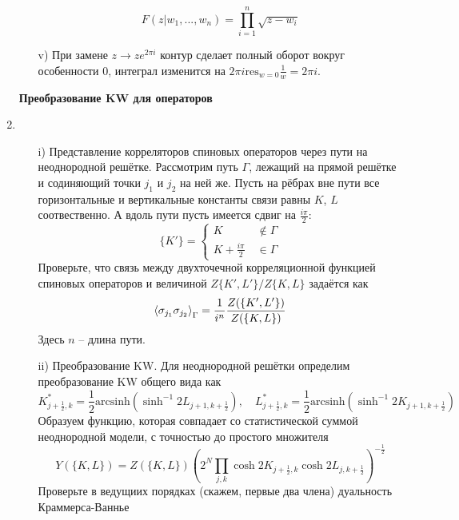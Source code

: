 \documentclass[12pt]{article}
\theoremstyle{definition}
\begin{document}
\begin{enumerate}
\begin{itemize}
\begin{equation}
            \boxed{F(z|w_1,...,w_n)=\prod\limits_{i=1}^n\sqrt{z-w_i}}
        \end{equation}
        \item[v)] При замене $z\rightarrow ze^{2\pi i}$ контур сделает полный оборот вокруг особенности $0$, интеграл изменится на $2\pi i\text{res}_{w=0}\frac{1}{w}=2\pi i$.
    \end{itemize}
\textbf{Преобразование KW для операторов}
\item
\begin{itemize}    
    \item[i)] Представление корреляторов спиновых операторов через пути на неоднородной решётке. Рассмотрим путь $\Gamma$, лежащий на прямой решётке и содиняющий точки $j_1$ и $j_2$ на ней же. Пусть на рёбрах вне пути все горизонтальные и вертикальные константы связи равны $K$, $L$ соотвественно. А вдоль пути пусть имеется сдвиг на $\frac{i\pi}{2}$:
    \begin{equation}
        \{K'\}=\begin{cases}
            K \quad\quad\quad\notin\Gamma\\
            K+\frac{i\pi}{2}\quad\in\Gamma
        \end{cases}
    \end{equation}
    Проверьте, что связь между двухточечной корреляционной функцией спиновых операторов и величиной $Z\{K',L'\}/Z\{K,L\}$ задаётся как
    \begin{equation}
        \braket{\sigma_{j_1}\sigma_{j_2}}_\Gamma=\frac{1}{i^n}\frac{Z(\{K',L'\})}{Z(\{K,L\})}
    \end{equation}
    Здесь $n$ -- длина пути.
    \item[ii)] Преобразование KW. Для неоднородной решётки определим преобразование KW общего вида как
    \begin{equation}
        K^*_{j+\frac{1}{2},k}=\frac{1}{2}\text{arcsinh}(\sinh^{-1}2L_{j+1,k+\frac{1}{2}}),\quad L^*_{j+\frac{1}{2},k}=\frac{1}{2}\text{arcsinh}(\sinh^{-1}2K_{j+1,k+\frac{1}{2}})
    \end{equation}
    Образуем функцию, которая совпадает со статистической суммой неоднородной модели, с точностью до простого множителя
    \begin{equation}
        Y(\{K,L\})=Z(\{K,L\})\left(2^N\prod\limits_{j,k}\cosh2K_{j+\frac{1}{2},k}\cosh2L_{j,k+\frac{1}{2}}\right)^{-\frac{1}{2}}
    \end{equation}
    Проверьте в ведущиих порядках (скажем, первые два члена) дуальность Краммерса-Ваннье
    \begin{equation}

\end{equation}
\end{itemize}
\end{enumerate}
\end{document}
